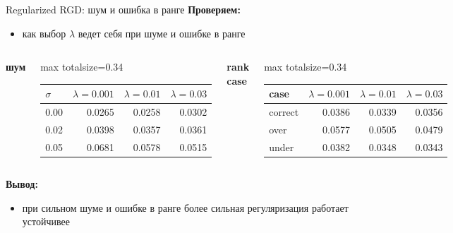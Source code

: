 \documentclass[aspectratio=169,xcolor=dvipsnames]{beamer}
\begin{document}
\begin{frame}{Regularized RGD: шум и ошибка в ранге}
\scriptsize
\textbf{Проверяем:}
\begin{itemize}
\item как выбор $\lambda$ ведет себя при шуме и ошибке в ранге
\end{itemize}

\begin{columns}[T]
\centering
\textbf{шум}

\vspace{0.05cm}
\begin{adjustbox}{max totalsize={\linewidth}{0.34\textheight}}
\begin{tabular}{lrrr}
\toprule
$\sigma$ & $\lambda=0.001$ & $\lambda=0.01$ & $\lambda=0.03$ \\
\midrule
0.00 & 0.0265 & \textcolor{green!50!black}{0.0258} & 0.0302 \\
0.02 & 0.0398 & \textcolor{green!50!black}{0.0357} & 0.0361 \\
0.05 & 0.0681 & 0.0578 & \textcolor{green!50!black}{0.0515} \\
\bottomrule
\end{tabular}
\end{adjustbox}

\centering
\textbf{rank case}

\vspace{0.05cm}
\begin{adjustbox}{max totalsize={\linewidth}{0.34\textheight}}
\begin{tabular}{lrrr}
\toprule
case & $\lambda=0.001$ & $\lambda=0.01$ & $\lambda=0.03$ \\
\midrule
correct & 0.0386 & \textcolor{green!50!black}{0.0339} & 0.0356 \\
over & 0.0577 & 0.0505 & \textcolor{green!50!black}{0.0479} \\
under & 0.0382 & 0.0348 & \textcolor{green!50!black}{0.0343} \\
\bottomrule
\end{tabular}
\end{adjustbox}
\end{columns}

\textbf{Вывод:}
\begin{itemize}
\item при сильном шуме и ошибке в ранге более сильная регуляризация работает устойчивее
\end{itemize}
\end{frame}
\end{document}
